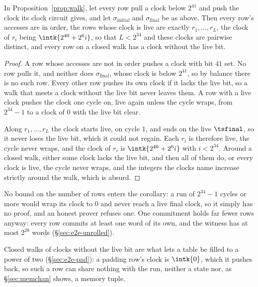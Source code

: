 \begin{corollary}\label{cor:clock}
In Proposition~\ref{prop:walk}, let every row pull a clock below $2^{41}$ and push the clock its clock circuit gives, and let $\sigma_{\mathrm{initial}}$ and $\sigma_{\mathrm{final}}$ be as above. Then every row's accesses are in order, the rows whose clock is live are exactly $r_1,\dots,r_L$, the clock of $r_i$ being $\intk{2^{40}+2^{6}i}$, so that $L<2^{34}$ and these clocks are pairwise distinct, and every row on a closed walk has a clock without the live bit.
\end{corollary}

\begin{proof}
A row whose accesses are not in order pushes a clock with bit $41$ set. No row pulls it, and neither does $\sigma_{\mathrm{final}}$, whose clock is below $2^{41}$, so by balance there is no such row. Every other row pushes its own clock if it lacks the live bit, so a walk that meets a clock without the live bit never leaves them. A row with a live clock pushes the clock one cycle on, live again unless the cycle wraps, from $2^{34}-1$ to a clock of $0$ with the live bit clear.

Along $r_1,\dots,r_L$ the clock starts live, on cycle $1$, and ends on the live $\tsfinal$, so it never loses the live bit, which it could not regain. Each $r_i$ is therefore live, the cycle never wraps, and the clock of $r_i$ is $\intk{2^{40}+2^{6}i}$ with $i<2^{34}$. Around a closed walk, either some clock lacks the live bit, and then all of them do, or every clock is live, the cycle never wraps, and the integers the clocks name increase strictly around the walk, which is absurd.
\end{proof}

No bound on the number of rows enters the corollary: a run of $2^{34}-1$ cycles or more would wrap its clock to $0$ and never reach a live final clock, so it simply has no proof, and an honest prover refuses one. One commitment holds far fewer rows anyway: every row commits at least one word of its own, and the witness has at most $2^{28}$ words (\S\ref{sec:e2e-unrolled}).

\begin{remark}
  Closed walks of clocks without the live bit are what lets a table be filled to a power of two (\S\ref{sec:e2e-pad}): a padding row's clock is $\intk{0}$, which it pushes back, so such a row can share nothing with the run, neither a state nor, as \S\ref{sec:memchan} shows, a memory tuple.
\end{remark}

